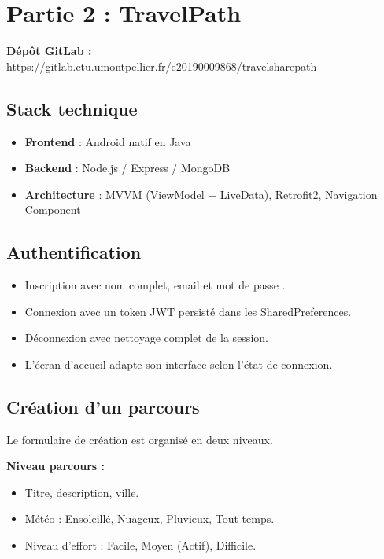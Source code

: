 \documentclass[12pt, a4paper, openany]{report}
\begin{document}
\chapter{Partie 2 : TravelPath}

\noindent\textbf{Dépôt GitLab :}
\url{https://gitlab.etu.umontpellier.fr/e20190009868/travelsharepath}

\section*{Stack technique}

\begin{itemize}
  \item \textbf{Frontend} : Android natif en Java
  \item \textbf{Backend} : Node.js / Express / MongoDB
  \item \textbf{Architecture} : MVVM (ViewModel + LiveData), Retrofit2, Navigation Component
\end{itemize}

\section{Authentification}

\begin{itemize}
  \item Inscription avec nom complet, email et mot de passe .
  \item Connexion avec un token JWT persisté dans les SharedPreferences.
  \item Déconnexion avec nettoyage complet de la session.
  \item L'écran d'accueil adapte son interface selon l'état de connexion.
\end{itemize}

\section{Création d'un parcours}

Le formulaire de création est organisé en deux niveaux.

\textbf{Niveau parcours :}
\begin{itemize}
  \item Titre, description, ville.
  \item Météo : Ensoleillé, Nuageux, Pluvieux, Tout temps.
  \item Niveau d'effort : Facile, Moyen (Actif), Difficile.
\end{itemize}
\end{document}

